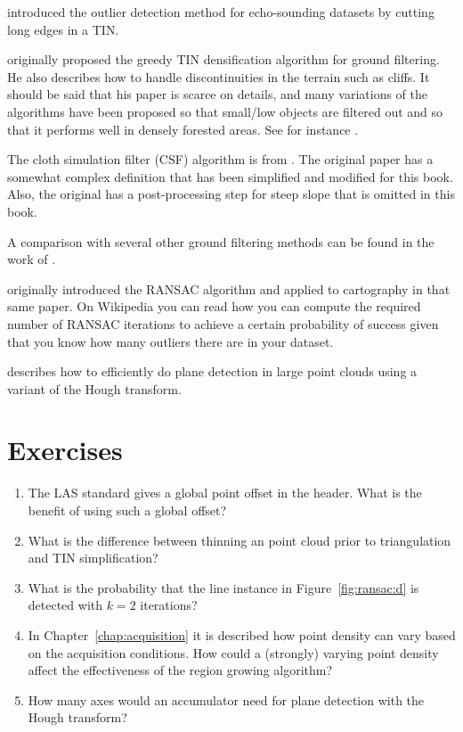 \citet{Arge10} introduced the outlier detection method for echo-sounding datasets by cutting long edges in a TIN\@.

\citet{axelsson2000generation} originally proposed the greedy TIN densification algorithm for ground filtering.
He also describes how to handle discontinuities in the terrain such as cliffs.
It should be said that his paper is scarce on details, and many variations of the algorithms have been proposed so that small/low objects are filtered out and so that it performs well in densely forested areas.
See for instance \citet{Lin14}. 

The cloth simulation filter (CSF) algorithm is from \citet{Zhang16}.
The original paper has a somewhat complex definition that has been simplified and modified for this book.
Also, the original has a post-processing step for steep slope that is omitted in this book.

A comparison with several other ground filtering methods can be found in the work of \citet{Meng10}.

\citet{Fischler81} originally introduced the RANSAC algorithm and applied to cartography in that same paper. On Wikipedia you can read how you can compute the required number of RANSAC iterations to achieve a certain probability of success given that you know how many outliers there are in your dataset.

\citet{Limberger15} describes how to efficiently do plane detection in large point clouds using a variant of the Hough transform.

%
\section{Exercises}


\begin{enumerate}
   \item The LAS standard gives a global point offset in the header. What is the benefit of using such a global offset?  
   \item What is the difference between thinning an point cloud prior to triangulation and TIN simplification?
  \item What is the probability that the line instance in Figure~\ref{fig:ransac:d} is detected with $k=2$ iterations?
  \item In Chapter~\ref{chap:acquisition} it is described how point density can vary based on the acquisition conditions. How could a (strongly) varying point density affect the effectiveness of the region growing algorithm?
  \item How many axes would an accumulator need for plane detection with the Hough transform?

\end{enumerate}
